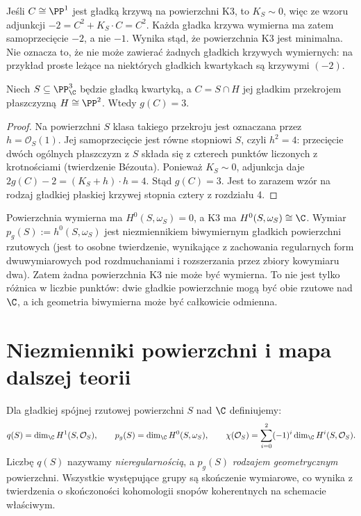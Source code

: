 \begin{przyklad}
\label{prz:ga6-k3-no-minus1}
Jeśli $C\cong\PP^1$ jest gładką krzywą na powierzchni K3,
to $K_S\sim0$, więc ze wzoru adjunkcji
$-2=C^2+K_S\cdot C=C^2$.
Każda gładka krzywa wymierna ma zatem
samoprzecięcie $-2$, a nie $-1$. Wynika stąd,
że powierzchnia K3 jest minimalna. Nie oznacza to,
że nie może zawierać żadnych gładkich krzywych
wymiernych: na przykład proste leżące na niektórych
gładkich kwartykach są krzywymi $(-2)$.
\end{przyklad}

\begin{stwierdzenie}
\label{st:ga6-quartic-plane-section}
Niech $S\subseteq\PP^3_\C$ będzie gładką kwartyką,
a $C=S\cap H$ jej gładkim przekrojem płaszczyzną
$H\cong\PP^2$. Wtedy $g(C)=3$.
\end{stwierdzenie}
\begin{proof}
Na powierzchni $S$ klasa takiego przekroju
jest oznaczana przez $h=\mathcal O_S(1)$.
Jej samoprzecięcie jest równe stopniowi $S$,
czyli $h^2=4$: przecięcie dwóch ogólnych
płaszczyzn z $S$ składa się z czterech punktów
liczonych z krotnościami (twierdzenie Bézouta).
Ponieważ $K_S\sim0$, adjunkcja daje
$2g(C)-2=(K_S+h)\cdot h=4$.
Stąd $g(C)=3$. Jest to zarazem wzór na rodzaj
gładkiej płaskiej krzywej stopnia cztery z rozdziału 4.
\end{proof}

\begin{uwaga}
Powierzchnia wymierna ma $H^0(S,\omega_S)=0$,
a K3 ma $H^0(S,\omega_S)\cong\C$.
Wymiar $p_g(S):=h^0(S,\omega_S)$ jest
niezmiennikiem biwymiernym gładkich powierzchni
rzutowych (jest to osobne twierdzenie, wynikające
z zachowania regularnych form dwuwymiarowych
pod rozdmuchaniami i rozszerzania przez zbiory
kowymiaru dwa). Zatem żadna powierzchnia K3
nie może być wymierna.
To nie jest tylko różnica w liczbie punktów:
dwie gładkie powierzchnie mogą być obie rzutowe
nad $\C$, a ich geometria biwymierna może być
całkowicie odmienna.
\end{uwaga}

\section{Niezmienniki powierzchni i mapa dalszej teorii}
\label{sec:ga6-invariants}

\begin{definicja}
Dla gładkiej spójnej rzutowej powierzchni $S$ nad
$\C$ definiujemy:
\[
 q(S)=\dim_{\C}H^1(S,\mathcal O_S),\qquad
 p_g(S)=\dim_{\C}H^0(S,\omega_S),\qquad
 \chi(\mathcal O_S)=\sum_{i=0}^2(-1)^i
 \dim_{\C}H^i(S,\mathcal O_S).
\]
Liczbę $q(S)$ nazywamy \emph{nieregularnością},
a $p_g(S)$ \emph{rodzajem geometrycznym} powierzchni.
Wszystkie występujące grupy są skończenie wymiarowe,
co wynika z twierdzenia o skończoności kohomologii
snopów koherentnych na schemacie właściwym.
\end{definicja}

